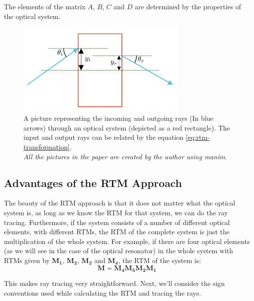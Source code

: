 \documentclass[12pt]{article}
\begin{document}
The elements of the matrix \(A\), \(B\), \(C\) and \(D\) are determined by the properties of the optical system.

\begin{figure}[h]
    \centering
    \includegraphics[width=0.75\textwidth]{images/box_c.png}
    \caption{A picture representing the incoming and outgoing rays (In blue arrows) through an optical system (depicted as a red rectangle). The input and output rays can be related by the equation \ref{eq:rtm-transformation}.\\ \textit{All the pictures in the paper are created by the author using {\color{cyan}manim}}\cite{manim}.}
    \label{fig:rtm-box}
\end{figure}
\subsection{Advantages of the RTM Approach}

The beauty of the RTM approach is that it does not matter what the optical system is, as long as we know the RTM for that system, we can do the ray tracing. Furthermore, if the system consists of a number of different optical elements, with different RTMs, the RTM of the complete system is just the multiplication of the whole system. For example, if there are four optical elements (as we will see in the case of the optical resonator) in the whole system with RTMs given by \(\mathbf{M_1}\), \(\mathbf{M_2}\), \(\mathbf{M_2}\) and \(\mathbf{M_4}\), the RTM of the system is:
\begin{equation*}
    \mathbf{M} = \mathbf{M_4}\mathbf{M_3}\mathbf{M_2}\mathbf{M_1}
\end{equation*}

This makes ray tracing very straightforward. Next, we'll consider the sign conventions used while calculating the RTM and tracing the rays.
\end{document}
